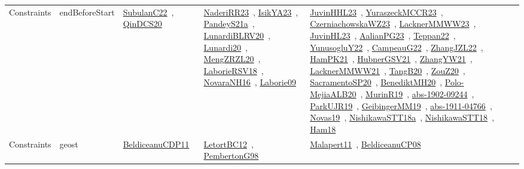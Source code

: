 {\begin{longtable}{lp{3cm}>{\raggedright\arraybackslash}p{6cm}>{\raggedright\arraybackslash}p{6cm}>{\raggedright\arraybackslash}p{8cm}}
Constraints & endBeforeStart & \href{works/SubulanC22.pdf}{SubulanC22}~\cite{SubulanC22}, \href{works/QinDCS20.pdf}{QinDCS20}~\cite{QinDCS20} & \href{works/NaderiRR23.pdf}{NaderiRR23}~\cite{NaderiRR23}, \href{works/IsikYA23.pdf}{IsikYA23}~\cite{IsikYA23}, \href{works/PandeyS21a.pdf}{PandeyS21a}~\cite{PandeyS21a}, \href{works/LunardiBLRV20.pdf}{LunardiBLRV20}~\cite{LunardiBLRV20}, \href{works/Lunardi20.pdf}{Lunardi20}~\cite{Lunardi20}, \href{works/MengZRZL20.pdf}{MengZRZL20}~\cite{MengZRZL20}, \href{works/LaborieRSV18.pdf}{LaborieRSV18}~\cite{LaborieRSV18}, \href{works/NovaraNH16.pdf}{NovaraNH16}~\cite{NovaraNH16}, \href{works/Laborie09.pdf}{Laborie09}~\cite{Laborie09} & \href{works/JuvinHHL23.pdf}{JuvinHHL23}~\cite{JuvinHHL23}, \href{works/YuraszeckMCCR23.pdf}{YuraszeckMCCR23}~\cite{YuraszeckMCCR23}, \href{works/CzerniachowskaWZ23.pdf}{CzerniachowskaWZ23}~\cite{CzerniachowskaWZ23}, \href{works/LacknerMMWW23.pdf}{LacknerMMWW23}~\cite{LacknerMMWW23}, \href{works/JuvinHL23.pdf}{JuvinHL23}~\cite{JuvinHL23}, \href{works/AalianPG23.pdf}{AalianPG23}~\cite{AalianPG23}, \href{works/Teppan22.pdf}{Teppan22}~\cite{Teppan22}, \href{works/YunusogluY22.pdf}{YunusogluY22}~\cite{YunusogluY22}, \href{works/CampeauG22.pdf}{CampeauG22}~\cite{CampeauG22}, \href{works/ZhangJZL22.pdf}{ZhangJZL22}~\cite{ZhangJZL22}, \href{works/HamPK21.pdf}{HamPK21}~\cite{HamPK21}, \href{works/HubnerGSV21.pdf}{HubnerGSV21}~\cite{HubnerGSV21}, \href{works/ZhangYW21.pdf}{ZhangYW21}~\cite{ZhangYW21}, \href{works/LacknerMMWW21.pdf}{LacknerMMWW21}~\cite{LacknerMMWW21}, \href{works/TangB20.pdf}{TangB20}~\cite{TangB20}, \href{works/ZouZ20.pdf}{ZouZ20}~\cite{ZouZ20}, \href{works/SacramentoSP20.pdf}{SacramentoSP20}~\cite{SacramentoSP20}, \href{works/BenediktMH20.pdf}{BenediktMH20}~\cite{BenediktMH20}, \href{works/Polo-MejiaALB20.pdf}{Polo-MejiaALB20}~\cite{Polo-MejiaALB20}, \href{works/MurinR19.pdf}{MurinR19}~\cite{MurinR19}, \href{works/abs-1902-09244.pdf}{abs-1902-09244}~\cite{abs-1902-09244}, \href{works/ParkUJR19.pdf}{ParkUJR19}~\cite{ParkUJR19}, \href{works/GeibingerMM19.pdf}{GeibingerMM19}~\cite{GeibingerMM19}, \href{works/abs-1911-04766.pdf}{abs-1911-04766}~\cite{abs-1911-04766}, \href{works/Novas19.pdf}{Novas19}~\cite{Novas19}, \href{works/NishikawaSTT18a.pdf}{NishikawaSTT18a}~\cite{NishikawaSTT18a}, \href{works/NishikawaSTT18.pdf}{NishikawaSTT18}~\cite{NishikawaSTT18}, \href{works/Ham18.pdf}{Ham18}~\cite{Ham18}\\
Constraints & geost & \href{works/BeldiceanuCDP11.pdf}{BeldiceanuCDP11}~\cite{BeldiceanuCDP11} & \href{works/LetortBC12.pdf}{LetortBC12}~\cite{LetortBC12}, \href{works/PembertonG98.pdf}{PembertonG98}~\cite{PembertonG98} & \href{works/Malapert11.pdf}{Malapert11}~\cite{Malapert11}, \href{works/BeldiceanuCP08.pdf}{BeldiceanuCP08}~\cite{BeldiceanuCP08}\\

\end{longtable}}
